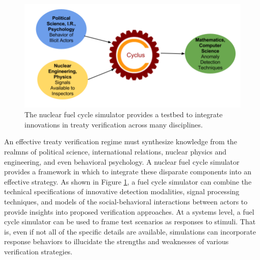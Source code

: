 \begin{figure}%
\begin{center}
\includegraphics[natwidth=162bp,natheight=227bp, scale=0.5]{./figs/cyclus_interdiscipline.png}
\end{center}
\caption{The \Cyclus nuclear fuel cycle simulator provides a testbed to integrate innovations in treaty verification across many disciplines.}
\label{fig:cyclus_diagram}
\end{figure}

An effective treaty verification regime must synthesize knowledge from the realmns of political science, international relations, nuclear physics and engineering, and even behavioral psychology.  A nuclear fuel cycle simulator provides a framework in which to integrate these disparate components into an effective strategy.  As shown in Figure \ref{fig:cyclus_diagram}, a fuel cycle simulator can combine the technical specifications of innovative detection modalities, signal processing techniques, and models of the social-behavioral interactions between actors to provide insights into proposed verification approaches.  At a systems level, a fuel cycle simulator can be used to frame test scenarios as responses to stimuli. That is, even if not all of the specific details are available, simulations can incorporate response behaviors to illucidate the strengths and weaknesses of various verification strategies.


